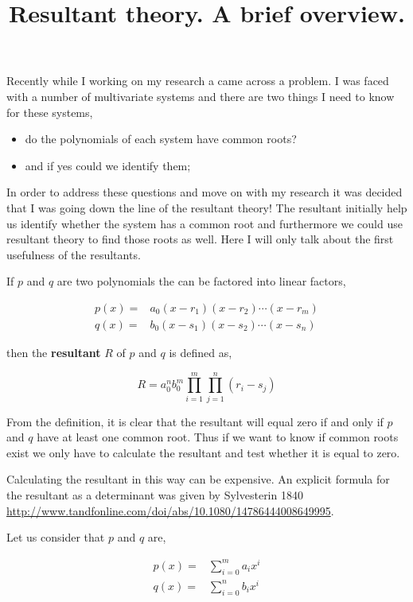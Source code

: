 \documentclass{article}
\title{Resultant theory. A brief overview.}
\begin{document}
\maketitle

Recently while I working on my research a came across a problem.
I was faced with a number of multivariate systems and there are two things I need
to know for these systems,

\begin{itemize}
    \item do the polynomials of each system have common roots?
    \item and if yes could we identify them;
\end{itemize}

In order to address these questions and move on with my research it was decided
that I was going down the line of the resultant theory! The resultant initially help
us identify whether the system has a common root and furthermore we could use
resultant theory to find those roots as well. Here I will only talk about the
first usefulness of the resultants.

If \(p\) and \(q\) are two polynomials the can be factored into linear factors,

\begin{eqnarray*}
    p(x) = & a_{0}(x-r_{1})(x-r_{2})\cdots(x-r_{m}) \\
    q(x)= & b_{0}(x-s_{1})(x-s_{2})\cdots(x-s_{n})
\end{eqnarray*}

then the \textbf{resultant} \(R\) of \(p\) and \(q\) is defined as,

\begin{equation*}
    R =a_{0}^{n}b_{0}^{m}\prod_{{i=1}}^{m}\prod_{{j=1}}^{n}(r_{i}-s_{j})
\end{equation*}

From the definition, it is clear that the resultant will equal zero if and only
if \(p\) and \(q\) have at least one common root. Thus if we want to know
if common roots exist we only have to calculate the resultant and test whether
it is equal to zero.

Calculating the resultant in this way can be expensive. An explicit formula for
the resultant as a determinant was given by Sylvesterin 1840
\url{http://www.tandfonline.com/doi/abs/10.1080/14786444008649995}.

Let us consider that \(p\) and \(q\) are,

\begin{eqnarray*}
    p(x) = & \displaystyle\sum_{i=0}^{m} a_i x^i \\
    q(x) = & \displaystyle\sum_{i=0}^{n} b_i x^i
\end{eqnarray*}
\end{document}
